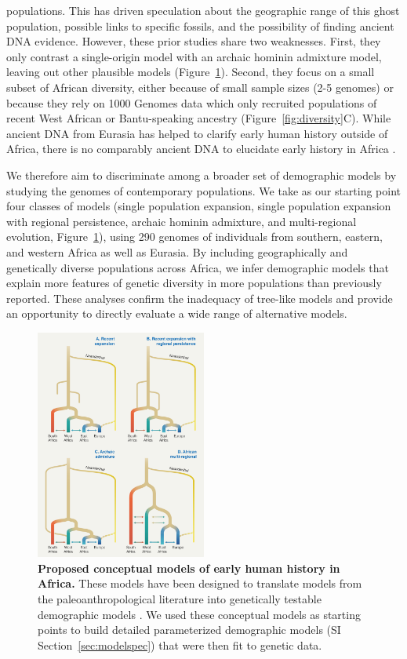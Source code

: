 \documentclass[]{article}
\begin{document}
populations.
This has driven speculation about the geographic range of this ghost
population, possible links to specific fossils, and the possibility of
finding ancient DNA evidence\citep{Hsieh2016-gk}. However, these prior
studies share two weaknesses. First, they only contrast a single-origin model
with an archaic hominin admixture model, leaving out other plausible models
\citep{Henn2018-rf} (Figure~\ref{fig:proposed-models}).
Second, they
focus on a small subset of African diversity, either because of small sample
sizes (2-5 genomes) or because they rely on 1000 Genomes data which only
recruited populations of recent West African or Bantu-speaking ancestry
(Figure~\ref{fig:diversity}C). 
While ancient DNA from Eurasia has helped to clarify early human history
outside of Africa, there is no comparably ancient DNA to elucidate early history
in Africa \citep{Lipson2022-xf}.

We therefore aim to discriminate among a broader set of demographic
models by studying the genomes of contemporary populations. We take as our
starting point four classes of models (single population expansion, single
population expansion with regional persistence, archaic hominin admixture, and
multi-regional evolution, Figure~\ref{fig:proposed-models}), using 290
genomes of individuals from southern, eastern, and western Africa as well as Eurasia.
By including geographically and genetically diverse populations across Africa, we
infer demographic models that explain more features of genetic diversity
in more populations than previously reported. These analyses confirm the inadequacy of
tree-like models and provide an opportunity to directly evaluate a wide range
of alternative models. 


\begin{figure}[ht]
    \centering
    \includegraphics[width=0.5\textwidth]{figures/proposed-models.png}
    \caption{
        \textbf{Proposed conceptual models of early human history in Africa.}
        These models have been designed to translate models from the 
        paleoanthropological literature into genetically testable demographic
        models \citep{Henn2018-rf}.
        We used these conceptual models as starting points to build detailed
        parameterized demographic models (SI Section~\ref{sec:modelspec})
        that were then fit to genetic data. 
    }
    \label{fig:proposed-models}
\end{figure}
\end{document}
